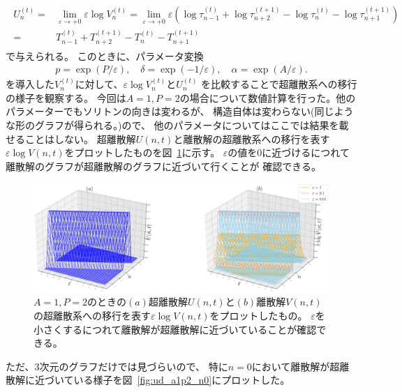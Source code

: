 \documentclass{jsarticle}
\begin{document}
\begin{enumerate}
\begin{align}
\begin{split}
U_{n}^{(t)}=&\lim_{\varepsilon\to+0}\varepsilon\log V_{n}^{(t)}
=\lim_{\varepsilon\to+0}\varepsilon\left(\log\tau_{n-1}^{(t)}+\log\tau_{n+2}^{(t+1)}-\log\tau_{n}^{(t)}-\log\tau_{n+1}^{(t+1)}\right)\\
=&T_{n-1}^{(t)}+T_{n+2}^{(t+1)}-T_{n}^{(t)}-T_{n+1}^{(t+1)}
\end{split}
\end{align}
で与えられる。
このときに、パラメータ変換
\begin{align}
p=\exp\left(P/\varepsilon\right),\quad
\delta=\exp\left(-1/\varepsilon\right),\quad
\alpha=\exp\left(A/\varepsilon\right).
\end{align}
を導入した$V_{n}^{(t)}$に対して、$\varepsilon\log V_{n}^{(t)}$と$U_{n}^{(t)}$
を比較することで超離散系への移行の様子を観察する。
今回は$A=1,P=2$の場合について数値計算を行った。他のパラメーターでもソリトンの向きは変わるが、
構造自体は変わらない(同じような形のグラフが得られる。)ので、
他のパラメータについてはここでは結果を載せることはしない。
超離散解$U(n,t)$と離散解の超離散系への移行を表す$\varepsilon\log V(n,t)$をプロットしたものを図~\ref{fig:ud_a1p2}に示す。
$\varepsilon$の値を$0$に近づけるにつれて離散解のグラフが超離散解のグラフに近づいて行くことが
確認できる。

\begin{figure}[H]
\begin{center}
\includegraphics[width=16cm]{lv_a1p3.eps}
\caption{$A=1,P=2$のときの$(a)$超離散解$U(n,t)$と$(b)$離散解$V(n,t)$の超離散系への移行を表す$\varepsilon\log V(n,t)$をプロットしたもの。
$\varepsilon$を小さくするにつれて離散解が超離散解に近づいていることが確認できる。}
\label{fig:ud_a1p2}
\end{center}
\end{figure}

ただ、3次元のグラフだけでは見づらいので、
特に$n=0$において離散解が超離散解に近づいている様子を図~\ref{fig:ud_a1p2_n0}にプロットした。


\end{enumerate}
\end{document}
